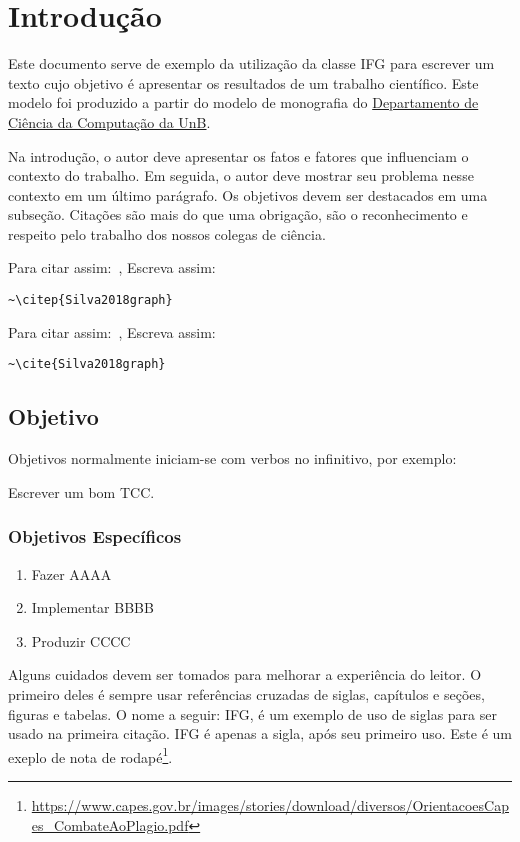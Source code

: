 \chapter{Introdução}\label{Introducao}

Este documento serve de exemplo da utilização da classe IFG para escrever um texto cujo objetivo é apresentar os resultados de um trabalho científico. 
Este modelo foi produzido a partir do modelo de monografia do \href{https://github.com/UnB-CIC/Monografia}{Departamento de Ciência da Computação da UnB}.

Na introdução, o autor deve apresentar os fatos e fatores que influenciam o contexto do trabalho.
Em seguida, o autor deve mostrar seu problema nesse contexto em um último parágrafo.
Os objetivos devem ser destacados em uma subseção.
Citações são mais do que uma obrigação, são o reconhecimento e respeito pelo trabalho dos nossos colegas de ciência.

Para citar assim:~\citep{Silva2018graph}, Escreva assim:

\begin{verbatim}
~\citep{Silva2018graph}
\end{verbatim}

Para citar assim:~\cite{Silva2018graph}, Escreva assim:

\begin{verbatim}
~\cite{Silva2018graph}
\end{verbatim}


\section*{Objetivo}

Objetivos normalmente iniciam-se com verbos no infinitivo, por exemplo: 

Escrever um bom TCC.

\subsection*{Objetivos Específicos}

\begin{enumerate}
	\item Fazer AAAA
	\item Implementar BBBB
	\item Produzir CCCC
\end{enumerate}

Alguns cuidados devem ser tomados para melhorar a experiência do leitor.
O primeiro deles é sempre usar referências cruzadas de siglas, capítulos e seções, figuras e tabelas.
O nome a seguir: \acf{IFG}, é um exemplo de uso de siglas para ser usado na primeira citação.
\ac{IFG} é apenas a sigla, após seu primeiro uso.
Este é um exeplo de nota de rodapé\footnote{\url{https://www.capes.gov.br/images/stories/download/diversos/OrientacoesCapes_CombateAoPlagio.pdf}}.

